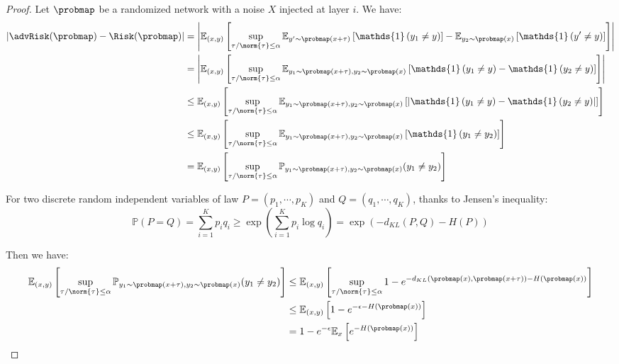 \begin{proof}
Let $\probmap$ be a randomized network with a noise $X$ injected at layer $i$. We have:
\begin{align*}
  \left|\advRisk(\probmap)-\Risk(\probmap)\right|  &= \left|\mathbb{E}_{(x,y)}\left[ \sup_{\tau/\norm{\tau}\leq\alpha} \mathbb{E}_{y'\sim \probmap(x+\tau)}\left[ \mathds{1}\left( y_1\neq y\right) \right]-  \mathbb{E}_{y_2\sim \probmap(x)}\left[ \mathds{1}\left(y'\neq y\right)\right]\right]\right| \\
  &=\left|\mathbb{E}_{(x,y)}\left[ \sup_{\tau/\norm{\tau}\leq\alpha} \mathbb{E}_{y_1\sim \probmap(x+\tau),y_2\sim \probmap(x)}\left[ \mathds{1}\left(y_1\neq y\right)-  \mathds{1}\left(y_2\neq y\right) \right]\right]\right|\\
  &\leq\mathbb{E}_{(x,y)}\left[ \sup_{\tau/\norm{\tau}\leq\alpha} \mathbb{E}_{y_1\sim \probmap(x+\tau),y_2\sim \probmap(x)}\left[\left| \mathds{1}\left(y_1\neq y\right)-  \mathds{1}\left(y_2\neq y\right)\right|\right]\right]\\
  &\leq\mathbb{E}_{(x,y)}\left[ \sup_{\tau/\norm{\tau}\leq\alpha} \mathbb{E}_{y_1\sim \probmap(x+\tau),y_2\sim \probmap(x)}\left[ \mathds{1}\left(y_1\neq y_2\right)\right]\right]\\
  &=\mathbb{E}_{(x,y)}\left[\sup_{\tau/\norm{\tau}\leq\alpha}\mathbb{P}_{y_1\sim \probmap(x+\tau),y_2\sim \probmap(x)}(y_1\neq y_2)\right]
\end{align*}

For two discrete random independent variables of law $P=(p_1, \cdots ,p_K)$ and $Q=(q_1, \cdots ,q_K)$, thanks to Jensen's inequality: 
$$\mathbb{P}(P=Q)=\sum_{i=1}^K p_i q_i \geq \exp{(\sum_{i=1}^K p_i \log q_i)}=\exp{(-d_{KL}(P,Q)-H(P))}$$

Then we have:
\begin{align*}
  \mathbb{E}_{(x,y)}\left[\sup_{\tau/\norm{\tau}\leq\alpha}\mathbb{P}_{y_1\sim \probmap(x+\tau),y_2\sim \probmap(x)}(y_1\neq y_2)\right] &\leq\mathbb{E}_{(x,y)}\left[\sup_{\tau/\norm{\tau}\leq\alpha}1-e^{-d_{KL}(\probmap(x),\probmap(x+\tau))-H(\probmap(x))} \right] \\
  &\leq \mathbb{E}_{(x,y)}\left[1-e^{-\epsilon-H(\probmap(x))} \right] \\
  &= 1 - e^{-\epsilon}\mathbb{E}_x\left[e^{-H(\probmap(x))}\right] \\
\end{align*}

\end{proof}


